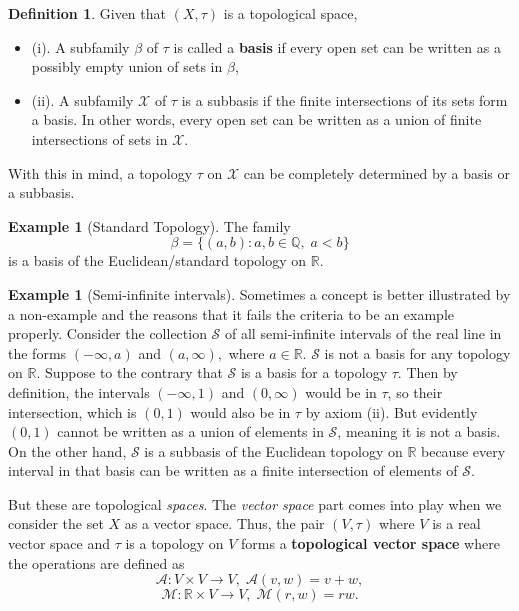 \documentclass{article}
\theoremstyle{definition}
\newtheorem{exmp}[thm]{Example}
\newtheorem{defn}[thm]{Definition}
\theoremstyle{remark}
\numberwithin{equation}{section}
\begin{document}
\begin{defn} 
Given that $(X, \tau)$ is a topological space, 
\begin{itemize}
    \item (i). A subfamily $\beta$ of $\tau$ is called a \textbf{basis} if every open set can be written as a possibly empty union of sets in $\beta$, 
    \item (ii). A subfamily $\mathcal{X}$ of $\tau$ is a subbasis if the finite intersections of its sets form a basis. In other words, every open set can be written as a union of finite intersections of sets in $\mathcal{X}$. 
\end{itemize}
With this in mind, a topology $\tau$ on $\mathcal{X}$ can be completely determined by a basis or a subbasis. 
\end{defn}

\begin{exmp} [Standard Topology]
The family 
$$\beta = \{(a,b) : a, b \in \mathbb{Q}, \; a < b \} $$
is a basis of the Euclidean/standard topology on $\mathbb{R}.$
\end{exmp}

\begin{exmp}[Semi-infinite intervals]
Sometimes a concept is better illustrated by a non-example and the reasons that it fails the criteria to be an example properly. Consider the collection $\mathcal{S}$ of all semi-infinite intervals of the real line in the forms $(-\infty, a)$ and $(a, \infty),$ where $a \in \mathbb{R}$. $\mathcal{S}$ is not a basis for any topology on $\mathbb{R}$. Suppose to the contrary that $\mathcal{S}$ is a basis for a topology $\tau$. Then by definition, the intervals $(- \infty, 1)$ and $(0, \infty)$ would be in $\tau$, so their intersection, which is $(0,1)$ would also be in $\tau$ by axiom (ii). But evidently $(0,1)$ cannot be written as a union of elements in $\mathcal{S}$, meaning it is not a basis. On the other hand, $\mathcal{S}$ is a subbasis of the Euclidean topology on $\mathbb{R}$ because every interval in that basis can be written as a finite intersection of elements of $\mathcal{S}$. 
\end{exmp}

But these are topological \textit{spaces}. The \textit{vector space} part comes into play when we consider the set $X$ as a vector space. Thus, the pair $(V, \tau)$ where $V$ is a real vector space and $\tau$ is a topology on $V$ forms a \textbf{topological vector space} where the operations are defined as 
$$\mathcal{A}: V \times V \rightarrow V, \; \mathcal{A} (v, w) = v+w,$$
$$\mathcal{M}: \mathbb{R} \times V \rightarrow V, \; \mathcal{M} (r, w) = rw.$$
\end{document}

